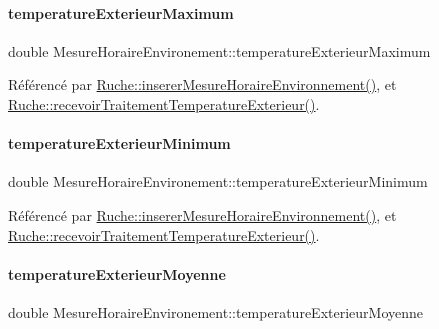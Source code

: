 \paragraph{\texorpdfstring{temperature\+Exterieur\+Maximum}{temperatureExterieurMaximum}}
{\footnotesize\ttfamily double Mesure\+Horaire\+Environement\+::temperature\+Exterieur\+Maximum}



Référencé par \hyperlink{class_ruche_ac52e79446c5629645e02e27d2a01e56c}{Ruche\+::inserer\+Mesure\+Horaire\+Environnement()}, et \hyperlink{class_ruche_a8482dda95a8a7888d5a60ea6f7d8729e}{Ruche\+::recevoir\+Traitement\+Temperature\+Exterieur()}.

\mbox{\label{struct_mesure_horaire_environement_ae9737a62128ecf2614901ebe0b118548}} 
\paragraph{\texorpdfstring{temperature\+Exterieur\+Minimum}{temperatureExterieurMinimum}}
{\footnotesize\ttfamily double Mesure\+Horaire\+Environement\+::temperature\+Exterieur\+Minimum}



Référencé par \hyperlink{class_ruche_ac52e79446c5629645e02e27d2a01e56c}{Ruche\+::inserer\+Mesure\+Horaire\+Environnement()}, et \hyperlink{class_ruche_a8482dda95a8a7888d5a60ea6f7d8729e}{Ruche\+::recevoir\+Traitement\+Temperature\+Exterieur()}.

\mbox{\label{struct_mesure_horaire_environement_a40be086e9b2454c0e70066a523a1b066}} 
\paragraph{\texorpdfstring{temperature\+Exterieur\+Moyenne}{temperatureExterieurMoyenne}}
{\footnotesize\ttfamily double Mesure\+Horaire\+Environement\+::temperature\+Exterieur\+Moyenne}



